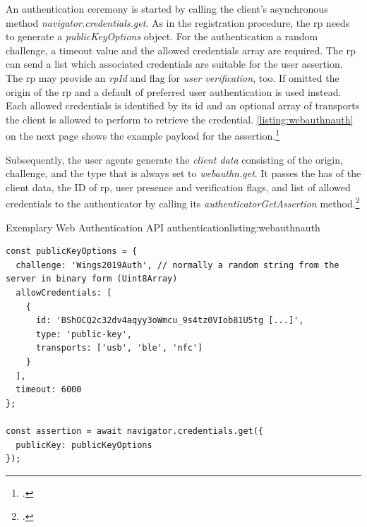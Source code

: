 An authentication ceremony is started by calling the client's asynchronous method \textit{navigator.credentials.get}. As in the registration procedure, the \gls{rp} needs to generate a \textit{publicKeyOptions} object. For the authentication a random challenge, a timeout value and the allowed credentials array are required. The \gls{rp} can send a list which associated credentials are suitable for the user assertion. The \gls{rp} may provide an \textit{rpId} and flag for \textit{user verification}, too. If omitted the origin of the \gls{rp} and a default of preferred user authentication is used instead. Each allowed credentials is identified by its id and an optional array of transports the client is allowed to perform to retrieve the credential. \autoref{listing:webauthnauth} on the next page shows the example payload for the assertion.\footcites[See][Chapter 5.1.4., 5.5, 5.10.3.]{w3c}

Subsequently, the user agents generate the \textit{client data} consisting of the origin, challenge, and the type that is always set to \textit{webauthn.get}. It passes the has of the client data, the ID of \gls{rp}, user presence and verification flags, and list of allowed credentials to the authenticator by calling its \textit{authenticatorGetAssertion} method.\footcites[See][Chapter 6.3.3]{w3c}
\\
\begin{example}{Exemplary Web Authentication API authentication}{listing:webauthnauth}
\begin{verbatim}
const publicKeyOptions = {
  challenge: 'Wings2019Auth', // normally a random string from the server in binary form (Uint8Array)
  allowCredentials: [
    {
      id: 'BShOCQ2c32dv4aqyy3oWmcu_9s4tz0VIob81U5tg [...]',
      type: 'public-key',
      transports: ['usb', 'ble', 'nfc']
    }
  ],
  timeout: 6000
};

const assertion = await navigator.credentials.get({
  publicKey: publicKeyOptions
});
\end{verbatim}
\end{example}

